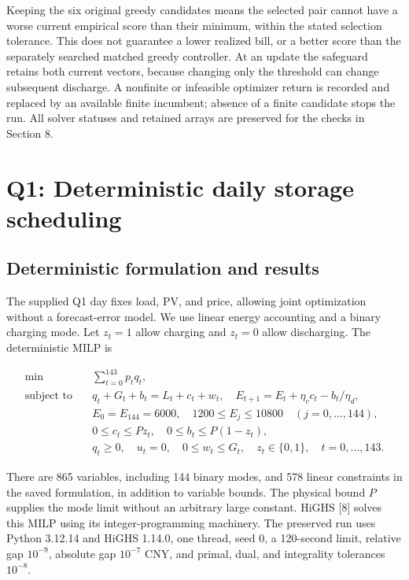 Keeping the six original greedy candidates means the selected pair cannot have a worse current empirical score than their minimum, within the stated selection tolerance. This does not guarantee a lower realized bill, or a better score than the separately searched matched greedy controller. At an update the safeguard retains both current vectors, because changing only the threshold can change subsequent discharge. A nonfinite or infeasible optimizer return is recorded and replaced by an available finite incumbent; absence of a finite candidate stops the run. All solver statuses and retained arrays are preserved for the checks in Section 8.

\Needspace{100pt}

\section{Q1: Deterministic daily storage scheduling}\label{q1-deterministic-daily-storage-scheduling}

\subsection{Deterministic formulation and results}\label{deterministic-formulation-and-results}


The supplied Q1 day fixes load, PV, and price, allowing joint optimization without a forecast-error model. We use linear energy accounting and a binary charging mode. Let \(z_t=1\) allow charging and \(z_t=0\) allow discharging. The deterministic MILP is

\[
\begin{aligned}
\min\quad &\sum_{t=0}^{143}p_tq_t,\\
\text{subject to}\quad
&q_t+G_t+b_t=L_t+c_t+w_t,\quad E_{t+1}=E_t+\eta_c c_t-b_t/\eta_d,\\
&E_0=E_{144}=6000,\quad1200\le E_j\le10800\quad(j=0,\ldots,144),\\
&0\le c_t\le Pz_t,\quad0\le b_t\le P(1-z_t),\\
&q_t\ge0,\quad u_t=0,\quad0\le w_t\le G_t,\quad z_t\in\{0,1\},\quad t=0,\ldots,143.
\end{aligned} \tag{9}
\]

There are 865 variables, including 144 binary modes, and 578 linear constraints in the saved formulation, in addition to variable bounds. The physical bound \(P\) supplies the mode limit without an arbitrary large constant. HiGHS {[}8{]} solves this MILP using its integer-programming machinery. The preserved run uses Python 3.12.14 and HiGHS 1.14.0, one thread, seed 0, a 120-second limit, relative gap \(10^{-9}\), absolute gap \(10^{-7}\) CNY, and primal, dual, and integrality tolerances \(10^{-8}\).

